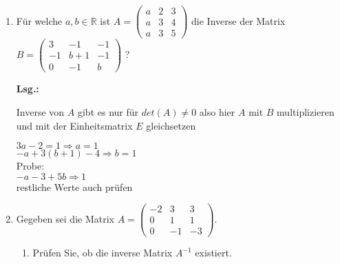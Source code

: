 \documentclass[12pt,a4paper]{scrreprt}
\newcommand{\R}{\mathds{R}}
\newcommand{\Lsg}{\textbf{Lsg.:}}
\begin{document}
\begin{enumerate}
\begin{enumerate}
		\item $C=\begin{pmatrix}
0 & 0 & -3 & 0 \\
0 & 21 & 9 & 0  \\
6 & 3 & 6 & 0\\
15 & -12 & 12 & 12 \\
\end{pmatrix}$

\Lsg


\item $D=\begin{pmatrix}
0 & 0 & -3 & 0 \\
0 & 21 & 9 & 0  \\
6 & 3 & 6 & 0\\
21 & -9 & 18 & 12 \\
\end{pmatrix}
=3^4 \cdot det A = 3^4 \cdot 56 = 4536 $

\Lsg

 zwei Zeilen (3 und 4) wurden addiert $\Rightarrow$ det D = det C
	\end{enumerate}


	\item Für welche $a,b \in \R$ ist $A=\begin{pmatrix}
a & 2 & 3 \\
a & 3 & 4\\
a & 3 & 5
\end{pmatrix}$ die Inverse der Matrix \\ $B=\begin{pmatrix}
3 & -1 & -1 \\
-1 & b+1 &-1\\
0 & -1 & b
\end{pmatrix}$ ?

\Lsg

Inverse von $A$ gibt es nur für $det(A) \neq 0$
also hier $A$ mit $B$ multiplizieren und mit der Einheitsmatrix $E$ gleichsetzen

$3a-2=1 \Rightarrow a=1$ \\
$-a+3(b+1)-4 \Rightarrow b=1$ \\

Probe: \\
$-a-3+5b \Rightarrow 1$ \\
restliche Werte auch prüfen

	\item 
 Gegeben sei die Matrix
$A=\begin{pmatrix}
-2 & 3 & 3 \\
0 & 1 & 1\\
0 & -1 & -3
\end{pmatrix}.$
	\begin{enumerate}
		\item Prüfen Sie, ob die inverse Matrix $A^{-1}$ existiert.
		

\end{enumerate}
\end{enumerate}
\end{document}
